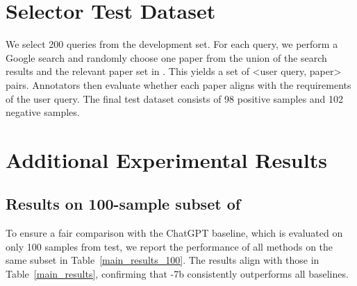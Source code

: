 \section{Selector Test Dataset} \label{sec:Details of Selector Evaluation}

We select 200 queries from the \autoS development set. For each query, we perform a Google search and randomly choose one paper from the union of the search results and the relevant paper set in \autoS. This yields a set of <user query, paper> pairs. Annotators then evaluate whether each paper aligns with the requirements of the user query. The final test dataset consists of 98 positive samples and 102 negative samples.

\begin{table}[htbp]

\centering
{}
\caption{Performance of the Crawler trained on different action cost $c(a_t)$ on AutoScholarQuery test set.}
\label{ablation_cost}
\vspace{-0.2cm}
\end{table}

\section{Additional Experimental Results}\label{exp_rst_appx}

\subsection{Results on 100-sample subset of \autoS}

To ensure a fair comparison with the ChatGPT baseline, which is evaluated on only 100 samples from \autoS test, we report the performance of all methods on the same subset in Table~\ref{main_results_100}. The results align with those in Table~\ref{main_results}, confirming that \pasa-7b consistently outperforms all baselines.

